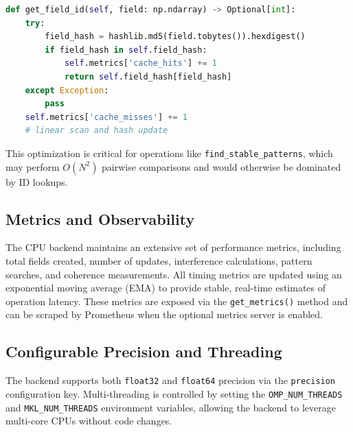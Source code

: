\begin{lstlisting}[language=Python]
def get_field_id(self, field: np.ndarray) -> Optional[int]:
    try:
        field_hash = hashlib.md5(field.tobytes()).hexdigest()
        if field_hash in self.field_hash:
            self.metrics['cache_hits'] += 1
            return self.field_hash[field_hash]
    except Exception:
        pass
    self.metrics['cache_misses'] += 1
    # linear scan and hash update
\end{lstlisting}

This optimization is critical for operations like \texttt{find\_stable\_patterns}, which may perform \(O(N^2)\) pairwise comparisons and would otherwise be dominated by ID lookups.

\subsection{Metrics and Observability}

The CPU backend maintains an extensive set of performance metrics, including total fields created, number of updates, interference calculations, pattern searches, and coherence measurements. All timing metrics are updated using an exponential moving average (EMA) to provide stable, real-time estimates of operation latency. These metrics are exposed via the \texttt{get\_metrics()} method and can be scraped by Prometheus when the optional metrics server is enabled.

\subsection{Configurable Precision and Threading}

The backend supports both \texttt{float32} and \texttt{float64} precision via the \texttt{precision} configuration key. Multi-threading is controlled by setting the \texttt{OMP\_NUM\_THREADS} and \texttt{MKL\_NUM\_THREADS} environment variables, allowing the backend to leverage multi-core CPUs without code changes.
